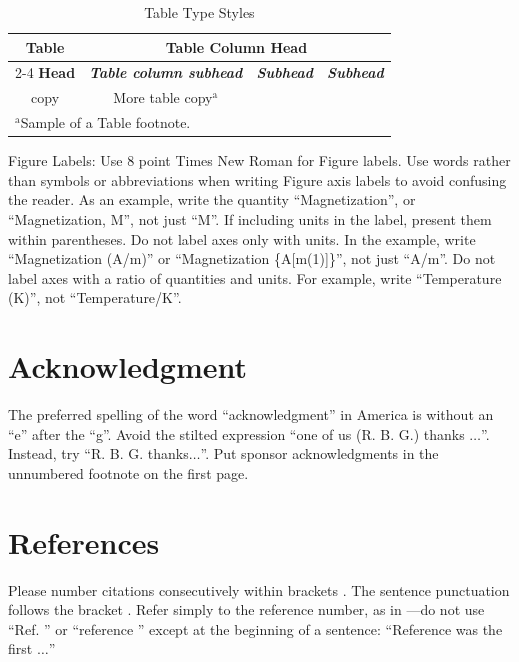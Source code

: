 \begin{table}[htbp]
\caption{Table Type Styles}
\begin{center}
\begin{tabular}{|c|c|c|c|}
\hline
\textbf{Table}&\multicolumn{3}{|c|}{\textbf{Table Column Head}} \\
\cline{2-4} 
\textbf{Head} & \textbf{\textit{Table column subhead}}& \textbf{\textit{Subhead}}& \textbf{\textit{Subhead}} \\
\hline
copy& More table copy$^{\mathrm{a}}$& &  \\
\hline
\multicolumn{4}{l}{$^{\mathrm{a}}$Sample of a Table footnote.}
\end{tabular}
\label{tab1}
\end{center}
\end{table}


Figure Labels: Use 8 point Times New Roman for Figure labels. Use words 
rather than symbols or abbreviations when writing Figure axis labels to 
avoid confusing the reader. As an example, write the quantity 
``Magnetization'', or ``Magnetization, M'', not just ``M''. If including 
units in the label, present them within parentheses. Do not label axes only 
with units. In the example, write ``Magnetization (A/m)'' or ``Magnetization 
\{A[m(1)]\}'', not just ``A/m''. Do not label axes with a ratio of 
quantities and units. For example, write ``Temperature (K)'', not 
``Temperature/K''.

\section*{Acknowledgment}

The preferred spelling of the word ``acknowledgment'' in America is without 
an ``e'' after the ``g''. Avoid the stilted expression ``one of us (R. B. 
G.) thanks $\ldots$''. Instead, try ``R. B. G. thanks$\ldots$''. Put sponsor 
acknowledgments in the unnumbered footnote on the first page.

\section*{References}

Please number citations consecutively within brackets \cite{b1}. The 
sentence punctuation follows the bracket \cite{b2}. Refer simply to the reference 
number, as in \cite{b3}---do not use ``Ref. \cite{b3}'' or ``reference \cite{b3}'' except at 
the beginning of a sentence: ``Reference \cite{b3} was the first $\ldots$''

